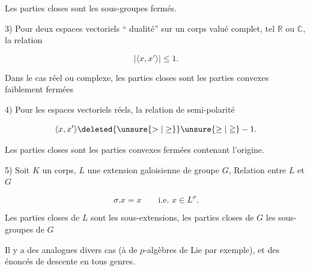 
Les parties closes sont les sous-groupes fermés.

3) Pour deux espaces vectoriels `` dualité'' sur un corps valué complet, tel $\mathbb R$ ou $\mathbb C$, la relation

\[
 |\langle x,x'\rangle|\leq 1.
\]

Dans le cas réel ou complexe, les parties closes sont les parties convexes  faiblement fermées

4) Pour les espaces vectoriels réels, la relation de semi-polarité

\[
 \langle x,x'\rangle\deleted{\unsure{>|\geq}}\unsure{\geq|\geqq}-1.
\]

Les parties closes sont les parties convexes  fermées contenant l'origine.

5) Soit $K$ un corps,  $L$ une extension galoisienne de groupe $G$, Relation entre $L$ et $G$

\[
 \sigma.x=x\qquad\text{i.e. }x\in L^\sigma.
\]

Les parties closes de $L$ sont les sous-extensions, les parties closes de $G$ les sous-groupes de $G$

Il y a des  analogues divers  cas  (à  de $p$-algèbres de Lie par exemple), et des énoncés de descente en tous genres.
